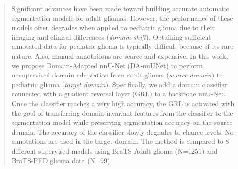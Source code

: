 \documentclass[runningheads]{llncs}
\begin{document}
%
\maketitle              %
%
\begin{abstract}
Significant advances have been made toward building accurate automatic segmentation models for adult gliomas. However, the performance of these models often degrades when applied to pediatric glioma due to their imaging and clinical differences (\textit{domain shift}). Obtaining sufficient annotated data for pediatric glioma is typically difficult because of its rare nature. Also, manual annotations are scarce and expensive. In this work, we propose Domain-Adapted nnU-Net (DA-nnUNet) to perform unsupervised domain adaptation from adult glioma (\textit{source domain}) to pediatric glioma (\textit{target domain}). Specifically, we add a domain classifier connected with a gradient reversal layer (GRL) to a backbone nnU-Net. Once the classifier reaches a very high accuracy, the GRL is activated with the goal of transferring domain-invariant features from the classifier to the segmentation model while preserving segmentation accuracy on the source domain. The accuracy of the classifier slowly degrades to chance levels. No annotations are used in the target domain. The method is compared to 8 different supervised models using BraTS-Adult glioma  (N=1251) and BraTS-PED glioma data (N=99).

\end{abstract}
\end{document}
